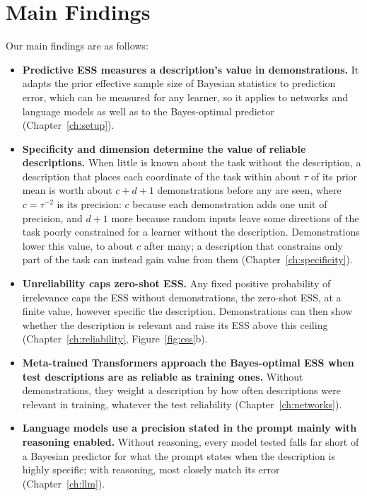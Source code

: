 \section{Main Findings}

Our main findings are as follows:
\begin{itemize}[leftmargin=*,itemsep=2pt,topsep=3pt]
\item \textbf{Predictive ESS measures a description's value in demonstrations.} It adapts the prior effective sample size of Bayesian statistics to prediction error, which can be measured for any learner, so it applies to networks and language models as well as to the Bayes-optimal predictor (Chapter~\ref{ch:setup}).
\item \textbf{Specificity and dimension determine the value of reliable descriptions.} When little is known about the task without the description, a description that places each coordinate of the task within about $\tau$ of its prior mean is worth about $c+d+1$ demonstrations before any are seen, where $c=\tau^{-2}$ is its precision: $c$ because each demonstration adds one unit of precision, and $d+1$ more because random inputs leave some directions of the task poorly constrained for a learner without the description. Demonstrations lower this value, to about $c$ after many; a description that constrains only part of the task can instead gain value from them (Chapter~\ref{ch:specificity}).
\item \textbf{Unreliability caps zero-shot ESS.} Any fixed positive probability of irrelevance caps the ESS without demonstrations, the zero-shot ESS, at a finite value, however specific the description. Demonstrations can then show whether the description is relevant and raise its ESS above this ceiling (Chapter~\ref{ch:reliability}, Figure~\ref{fig:ess}b).
\item \textbf{Meta-trained Transformers approach the Bayes-optimal ESS when test descriptions are as reliable as training ones.} Without demonstrations, they weight a description by how often descriptions were relevant in training, whatever the test reliability (Chapter~\ref{ch:networks}).
\item \textbf{Language models use a precision stated in the prompt mainly with reasoning enabled.} Without reasoning, every model tested falls far short of a Bayesian predictor for what the prompt states when the description is highly specific; with reasoning, most closely match its error (Chapter~\ref{ch:llm}).
\end{itemize}

